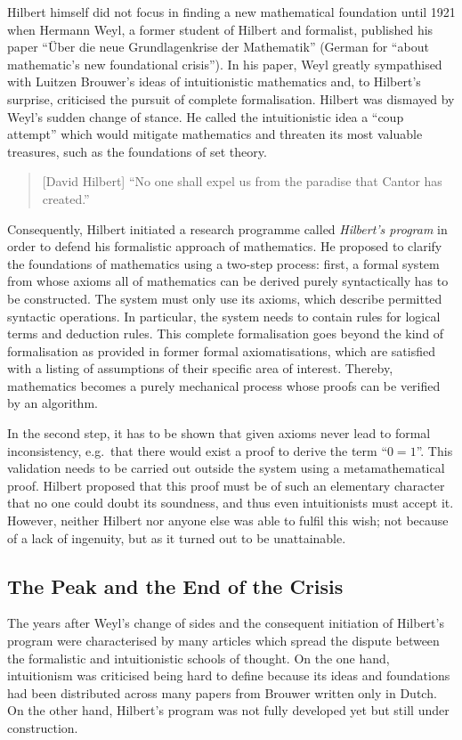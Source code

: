\documentclass{article}
\begin{document}
Hilbert himself did not focus in finding a new mathematical foundation until 1921 when Hermann Weyl, a former student of Hilbert and formalist, published his paper ``Über die neue Grundlagenkrise der Mathematik'' (German for ``about mathematic's new foundational crisis''). In his paper, Weyl greatly sympathised with Luitzen Brouwer's ideas of intuitionistic mathematics and, to Hilbert's surprise, criticised the pursuit of complete formalisation. Hilbert was dismayed by Weyl's sudden change of stance. He called the intuitionistic idea a ``coup attempt'' which would mitigate mathematics and threaten its most valuable treasures, such as the foundations of set theory.\cite{hilbert_coup}
\begin{quote}[David Hilbert]
``No one shall expel us from the paradise that Cantor has created.''\cite{hilbert_paradise}
\end{quote}
Consequently, Hilbert initiated a research programme called \textit{Hilbert's program} in order to defend his formalistic approach of mathematics. He proposed to clarify the foundations of mathematics using a two-step process: first, a formal system from whose axioms all of mathematics can be derived purely syntactically has to be constructed. The system must only use its axioms, which describe permitted syntactic operations. In particular, the system needs to contain rules for logical terms and deduction rules. This complete formalisation goes beyond the kind of formalisation as provided in former formal axiomatisations, which are satisfied with a listing of assumptions of their specific area of interest. Thereby, mathematics becomes a purely mechanical process whose proofs can be verified by an algorithm.

In the second step, it has to be shown that given axioms never lead to formal inconsistency, e.g.\ that there would exist a proof to derive the term ``$0=1$''. This validation needs to be carried out outside the system using a metamathematical proof. Hilbert proposed that this proof must be of such an elementary character that no one could doubt its soundness, and thus even intuitionists must accept it. However, neither Hilbert nor anyone else was able to fulfil this wish; not because of a lack of ingenuity, but as it turned out to be unattainable.


\subsection{The Peak and the End of the Crisis}\label{ssec_end_crisis}
The years after Weyl's change of sides and the consequent initiation of Hilbert's program were characterised by many articles which spread the dispute between the formalistic and intuitionistic schools of thought. On the one hand, intuitionism was criticised being hard to define because its ideas and foundations had been distributed across many papers from Brouwer written only in Dutch. On the other hand, Hilbert's program was not fully developed yet but still under construction.
\end{document}
